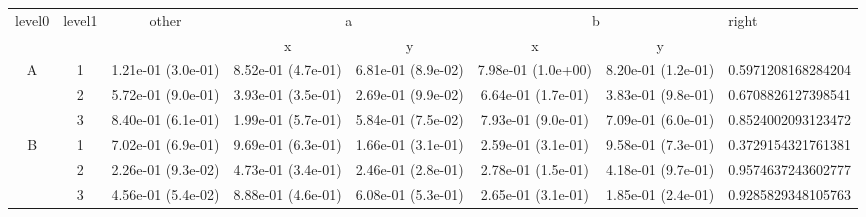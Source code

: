 \begin{tabular}{cccccccl}
\toprule
\multirow{2}{*}{level0} & \multirow{2}{*}{level1}& \multirow{2}{*}{other}&\multicolumn{2}{c}{a}&\multicolumn{2}{c}{b}& \multirow{2}{*}{right}\tabularnewline
\cmidrule(lr){4-5}
\cmidrule(lr){6-7}
&&&x&y&x&y\tabularnewline
\midrule
\multirow{3}{*}{A}&1& 1.21e-01 (3.0e-01)& 8.52e-01 (4.7e-01)& 6.81e-01 (8.9e-02)& 7.98e-01 (1.0e+00)& 8.20e-01 (1.2e-01)& 0.5971208168284204\tabularnewline
&2& 5.72e-01 (9.0e-01)& 3.93e-01 (3.5e-01)& 2.69e-01 (9.9e-02)& 6.64e-01 (1.7e-01)& 3.83e-01 (9.8e-01)& 0.6708826127398541\tabularnewline
&3& 8.40e-01 (6.1e-01)& 1.99e-01 (5.7e-01)& 5.84e-01 (7.5e-02)& 7.93e-01 (9.0e-01)& 7.09e-01 (6.0e-01)& 0.8524002093123472\tabularnewline
\midrule
\multirow{3}{*}{B}&1& 7.02e-01 (6.9e-01)& 9.69e-01 (6.3e-01)& 1.66e-01 (3.1e-01)& 2.59e-01 (3.1e-01)& 9.58e-01 (7.3e-01)& 0.3729154321761381\tabularnewline
&2& 2.26e-01 (9.3e-02)& 4.73e-01 (3.4e-01)& 2.46e-01 (2.8e-01)& 2.78e-01 (1.5e-01)& 4.18e-01 (9.7e-01)& 0.9574637243602777\tabularnewline
&3& 4.56e-01 (5.4e-02)& 8.88e-01 (4.6e-01)& 6.08e-01 (5.3e-01)& 2.65e-01 (3.1e-01)& 1.85e-01 (2.4e-01)& 0.9285829348105763\tabularnewline
\bottomrule
\end{tabular}
